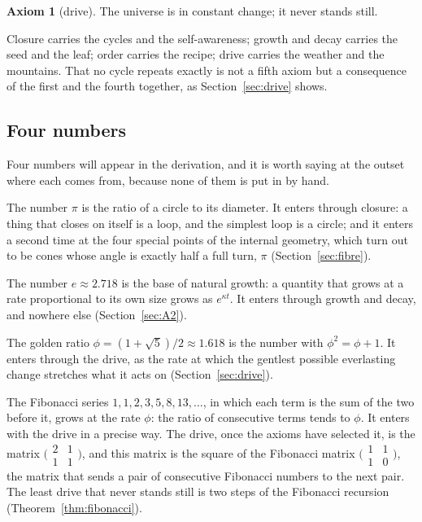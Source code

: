 \documentclass[11pt,a4paper]{article}
\theoremstyle{plain}
\theoremstyle{definition}
\newtheorem{axiom}{Axiom}
\theoremstyle{remark}
\begin{document}
\begin{axiom}[drive]\label{ax:A4}
The universe is in constant change; it never stands still.
\end{axiom}

Closure carries the cycles and the self-awareness; growth and decay carries the seed and the leaf; order carries the recipe; drive carries the weather and the mountains. That no cycle repeats exactly is not a fifth axiom but a consequence of the first and the fourth together, as Section~\ref{sec:drive} shows.

\subsection{Four numbers}\label{sec:numbers}

Four numbers will appear in the derivation, and it is worth saying at the outset where each comes from, because none of them is put in by hand.

The number $\pi$ is the ratio of a circle to its diameter. It enters through closure: a thing that closes on itself is a loop, and the simplest loop is a circle; and it enters a second time at the four special points of the internal geometry, which turn out to be cones whose angle is exactly half a full turn, $\pi$ (Section~\ref{sec:fibre}).

The number $e\approx2.718$ is the base of natural growth: a quantity that grows at a rate proportional to its own size grows as $e^{\kappa t}$. It enters through growth and decay, and nowhere else (Section~\ref{sec:A2}).

The golden ratio $\phi=(1+\sqrt5)/2\approx1.618$ is the number with $\phi^{2}=\phi+1$. It enters through the drive, as the rate at which the gentlest possible everlasting change stretches what it acts on (Section~\ref{sec:drive}).

The Fibonacci series $1,1,2,3,5,8,13,\dots$, in which each term is the sum of the two before it, grows at the rate $\phi$: the ratio of consecutive terms tends to $\phi$. It enters with the drive in a precise way. The drive, once the axioms have selected it, is the matrix $\bigl(\begin{smallmatrix}2&1\\1&1\end{smallmatrix}\bigr)$, and this matrix is the square of the Fibonacci matrix $\bigl(\begin{smallmatrix}1&1\\1&0\end{smallmatrix}\bigr)$, the matrix that sends a pair of consecutive Fibonacci numbers to the next pair. The least drive that never stands still is two steps of the Fibonacci recursion (Theorem~\ref{thm:fibonacci}).
\end{document}
